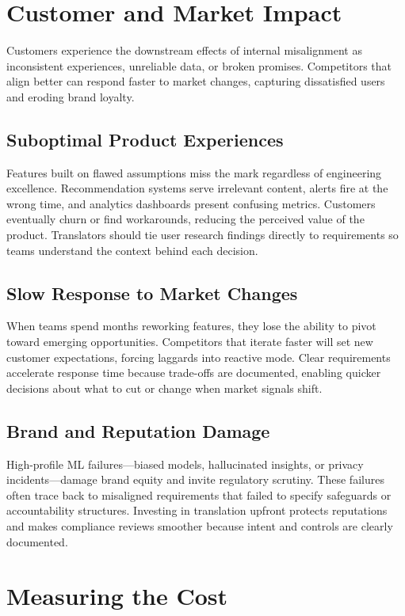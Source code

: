 \section{Customer and Market Impact}
\label{sec:customer-impact}

Customers experience the downstream effects of internal misalignment as inconsistent experiences, unreliable data, or broken promises. Competitors that align better can respond faster to market changes, capturing dissatisfied users and eroding brand loyalty.

\subsection{Suboptimal Product Experiences}
Features built on flawed assumptions miss the mark regardless of engineering excellence. Recommendation systems serve irrelevant content, alerts fire at the wrong time, and analytics dashboards present confusing metrics. Customers eventually churn or find workarounds, reducing the perceived value of the product. Translators should tie user research findings directly to requirements so teams understand the context behind each decision.

\subsection{Slow Response to Market Changes}
When teams spend months reworking features, they lose the ability to pivot toward emerging opportunities. Competitors that iterate faster will set new customer expectations, forcing laggards into reactive mode. Clear requirements accelerate response time because trade-offs are documented, enabling quicker decisions about what to cut or change when market signals shift.

\subsection{Brand and Reputation Damage}
High-profile ML failures---biased models, hallucinated insights, or privacy incidents---damage brand equity and invite regulatory scrutiny. These failures often trace back to misaligned requirements that failed to specify safeguards or accountability structures. Investing in translation upfront protects reputations and makes compliance reviews smoother because intent and controls are clearly documented.

\section{Measuring the Cost}
\label{sec:measuring-cost}

